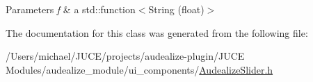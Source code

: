 \begin{DoxyParams}{Parameters}
{\em f} & a std\+::function$<$\+String (float)$>$ \\
\hline
\end{DoxyParams}


The documentation for this class was generated from the following file\+:\begin{DoxyCompactItemize}
\item 
/\+Users/michael/\+J\+U\+C\+E/projects/audealize-\/plugin/\+J\+U\+C\+E Modules/audealize\+\_\+module/ui\+\_\+components/\hyperlink{_audealize_slider_8h}{Audealize\+Slider.\+h}\end{DoxyCompactItemize}
